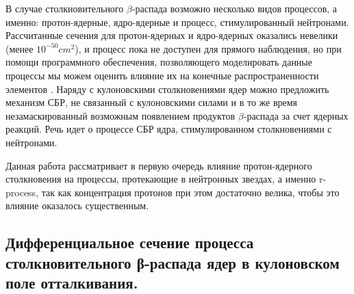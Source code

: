 \documentclass[14pt, a4paper]{article}
\numberwithin{figure}{section}
\numberwithin{equation}{section}
\begin{document}
В случае столкновительного $\beta$-распада возможно несколько видов процессов, а именно: протон-ядерные, ядро-ядерные и процесс, стимулированный нейтронами. Рассчитанные сечения для протон-ядерных и ядро-ядерных оказались невелики (менее $10^{-50}cm^2$), и процесс пока не доступен для прямого наблюдения, но при помощи программного обеспечения, позволяющего моделировать данные процессы мы можем оценить влияние их на конечные распространенности элементов \cite{tak_article}. Наряду с кулоновскими столкновениями ядер можно предложить механизм СБР, не связанный с кулоновскими силами и в то же время незамаскированный возможным появлением продуктов $\beta$-распада за счет ядерных реакций. Речь идет о процессе СБР ядра, стимулированном столкновениями с нейтронами.

Данная работа рассматривает в первую очередь влияние протон-ядерного столкновения на процессы, протекающие в нейтронных звездах, а именно r-process, так как концентрация протонов при этом достаточно велика, чтобы это влияние оказалось существенным. 

\subsection{Дифференциальное сечение  процесса столкновительного
	β-распада ядер в кулоновском поле отталкивания.}
\end{document}
